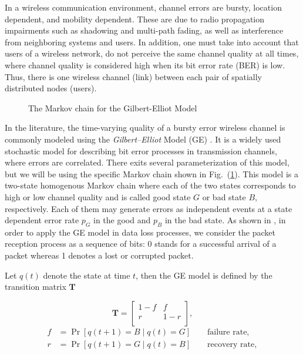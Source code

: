 In a wireless communication environment, channel errors are bursty, location
dependent, and mobility dependent. These are due to radio propagation
impairments such as shadowing and multi-path fading, as well as interference
from neighboring systems and users. In addition, one must take into account that
users of a wireless network, do not perceive the same channel quality at all
times, where channel quality is considered high when its bit error rate (BER) is
low. Thus, there is one wireless channel (link) between each pair of spatially
distributed nodes (users). 

\begin{figure}[htb]
  \centering
   
  \caption{The Markov chain for the Gilbert-Elliot Model}
  \label{fig:GE_FSM}
\end{figure}

In the literature, the time-varying quality of a bursty error wireless channel
is commonly modeled using the \textit{Gilbert–Elliot} Model (GE)
\cite{gilbert1960capacity, elliott1963estimates}. It is a widely used stochastic
model for describing bit error processes in transmission channels, where errors
are correlated. There exits several parameterization of this model, but we will
be using the specific Markov chain shown in Fig.~(\ref{fig:GE_FSM}). This model
is a two-state homogenous Markov chain where each of the two states corresponds
to high or low channel quality and is called good state $G$ or bad state $B$,
respectively. Each of them may generate errors as independent events at a state
dependent error rate $p_G$ in the good and $p_B$ in the bad state. As shown in
\cite{hasslinger2008gilbert}, in order to apply the GE model in data loss
processes, we consider the packet reception process as a sequence of bits: 0
stands for a successful arrival of a packet whereas 1 denotes a lost or
corrupted packet.

Let $q(t)$ denote the state at time $t$, then the GE model is defined by the
transition matrix $\boldsymbol{T}$

\begin{equation}
  \label{eq:GE_transition}
  \boldsymbol{T} = 
  \begin{bmatrix}
    1-f & f \\
    r & 1-r \\
  \end{bmatrix},
\end{equation}
\begin{align}
  f &= \Pr[q(t+1) = B \mid q(t) = G] \qquad \textrm{failure rate}, \\
  r &= \Pr[q(t+1) = G \mid q(t) = B] \qquad \textrm{recovery rate},
\end{align}

